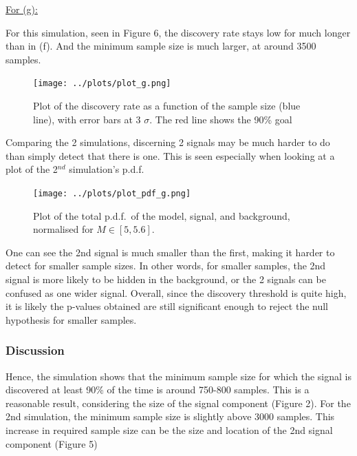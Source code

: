 \documentclass[12pt]{report} %
\begin{document}
\vspace*{1\baselineskip}

\underline{For (g):}

\vspace*{1\baselineskip}
For this simulation, seen in Figure 6, the discovery rate stays low for much longer than in (f). And the minimum sample size is much larger, at around 3500 samples.

\begin{figure}[htb]
    \centering
    \texttt{[image: ../plots/plot\_g.png]}
    \captionsetup{margin=1.3cm}
    \caption[width=0.2\pdfpagewidth]{Plot of the discovery rate as a function of the sample size (blue line), with error bars at 3 $\sigma$. The red line shows the 90\% goal}
\end{figure}

\newpage
Comparing the 2 simulations, discerning 2 signals may be much harder to do than simply detect that there is one. This is seen especially when looking at a plot of the 2$^{nd}$ simulation's p.d.f.

\begin{figure}[htb]
    \centering
    \texttt{[image: ../plots/plot\_pdf\_g.png]}
    \captionsetup{margin=1.3cm}
    \caption[width=0.2\pdfpagewidth]{Plot of the total p.d.f.\ of the model, signal, and background, normalised for $M\in{[5,5.6]}$.}
\end{figure}

One can see the 2nd signal is much smaller than the first, making it harder to detect for smaller sample sizes. In other words, for smaller samples, the 2nd signal is more likely to be hidden in the background, or the 2 signals can be confused as one wider signal. Overall, since the discovery threshold is quite high, it is likely the p-values obtained are still significant enough to reject the null hypothesis for smaller samples. 
\newpage
\subsubsection*{Discussion}
Hence, the simulation shows that the minimum sample size for which the signal is discovered at least 90\% of the time is around 750-800 samples. This is a reasonable result, considering the size of the signal component (Figure 2). For the 2nd simulation, the minimum sample size is slightly above 3000 samples. This increase in required sample size can be the size and location of the 2nd signal component (Figure 5)




\end{document}
